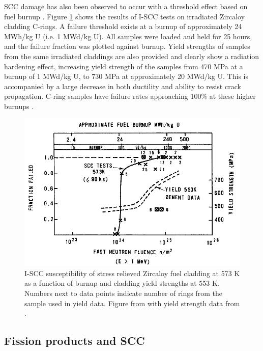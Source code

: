 SCC damage has also been observed to occur with a threshold effect based on fuel burnup \cite{Wood1974}. Figure \ref{figure:SCCthreshold} shows the results of I-SCC tests on irradiated Zircaloy cladding C-rings. A failure threshold exists at a burnup of approximately 24 MWh/kg U (i.e. 1 MWd/kg U). All samples were loaded and held for 25 hours, and the failure fraction was plotted against burnup. Yield strengths of samples from the same irradiated claddings are also provided and clearly show a radiation hardening effect, increasing yield strength of the samples from 470 MPa at a burnup of 1 MWd/kg U, to 730 MPa at approximately 20 MWd/kg U. This is accompanied by a large decrease in both ductility and ability to resist crack propagation. C-ring samples have failure rates approaching 100\% at these higher burnups \cite{bcoxpelletclad1990}.

\begin{figure}[ht] %
\centering
\includegraphics[width=14.5cm]{images/SCCthreshold.png}
\caption[I-SCC susceptibility of stress relieved Zircaloy fuel cladding at 573 K as a function of burnup and cladding yield strengths at 553 K. Numbers next to data points indicate number of rings from the sample used in yield data.]{I-SCC susceptibility of stress relieved Zircaloy fuel cladding at 573 K as a function of burnup and cladding yield strengths at 553 K. Numbers next to data points indicate number of rings from the sample used in yield data. Figure from \cite{bcoxpelletclad1990} with yield strength data from \cite{Bement1964}.}
\label{figure:SCCthreshold}
\end{figure}

\subsection{Fission products and SCC}

